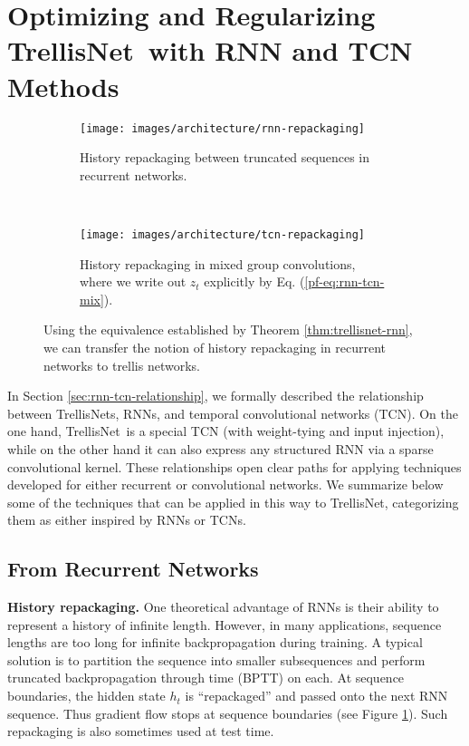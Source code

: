 \documentclass{article} \usepackage{iclr2019_conference,times}
\newcommand\mypara[1]{\vspace{0mm}\noindent\textbf{#1}}
\newcommand{\model}{TrellisNet}
\begin{document}
\newpage

\section{Optimizing and Regularizing \model~with RNN and TCN Methods}
\label{appendix:optimize-trellis}

\begin{figure}[h]
    \centering
    \vspace{-.3in}
    \begin{subfigure}[b]{.44\textwidth}
        \centering
        \texttt{[image: images/architecture/rnn-repackaging]}
        \caption{History repackaging between truncated sequences in recurrent networks.}
        \label{fig:rnn-repackaging}
    \end{subfigure}
    ~
    \begin{subfigure}[b]{.54\textwidth}
        \centering
        \texttt{[image: images/architecture/tcn-repackaging]}
        \caption{History repackaging in mixed group convolutions, where we write out $z_t$ explicitly by Eq. (\ref{pf-eq:rnn-tcn-mix}).}
        \label{fig:tcn-repackaging}
    \end{subfigure}
    \vspace{-.15in}
    \caption{Using the equivalence established by Theorem \ref{thm:trellisnet-rnn}, we can transfer the notion of history repackaging in recurrent networks to trellis networks.}
    \label{fig:repackaging}
\end{figure}

In Section \ref{sec:rnn-tcn-relationship}, we formally described the relationship between TrellisNets, RNNs, and temporal convolutional networks (TCN). On the one hand, \model~is a special TCN (with weight-tying and input injection), while on the other hand it can also express any structured RNN via a sparse convolutional kernel. These relationships open clear paths for applying techniques developed for either recurrent or convolutional networks. We summarize below some of the techniques that can be applied in this way to TrellisNet, categorizing them as either inspired by RNNs or TCNs.

\subsection{From Recurrent Networks}
\label{appendix:from-rnns}

\mypara{History repackaging.}
One theoretical advantage of RNNs is their ability to represent a history of infinite length. However, in many applications, sequence lengths are too long for infinite backpropagation during training. A typical solution is to partition the sequence into smaller subsequences and perform truncated backpropagation through time (BPTT) on each. At sequence boundaries, the hidden state $h_t$ is ``repackaged'' and passed onto the next RNN sequence. Thus gradient flow stops at sequence boundaries (see Figure \ref{fig:rnn-repackaging}). Such repackaging is also sometimes used at test time.
\end{document}
